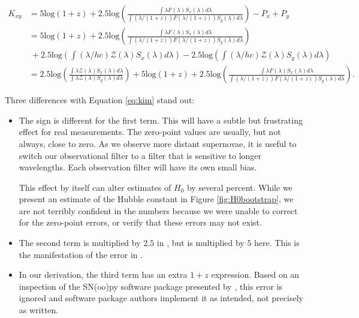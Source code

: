 \documentclass[linenumbers]{aastex631}
\begin{document}
\begin{equation}
\begin{aligned}
  K_{xy} &= 5 \text{log} (1 + z)
            + 2.5 \text{log} \left(
              \frac{\int \lambda F(\lambda) S_x(\lambda) d\lambda}
                   {\int (\lambda / (1+z)) F(\lambda / (1+z)) S_y(\lambda) d\lambda} \right)
            - P_x + P_y \\
         &= 5 \text{log} (1 + z)
            + 2.5 \text{log} \left(
              \frac{\int \lambda F(\lambda) S_x(\lambda) d\lambda}
                   {\int (\lambda / (1+z)) F(\lambda / (1+z)) S_y(\lambda) d\lambda} \right) \\ &\ 
            + 2.5 \text{log} \left( \int (\lambda / hc) \mathcal{Z}(\lambda) S_x(\lambda) d\lambda \right)
            - 2.5 \text{log} \left( \int (\lambda / hc) \mathcal{Z}(\lambda) S_y(\lambda) d\lambda \right) \\
         &= 2.5 \text{log} \left(
              \frac{\int \lambda \mathcal{Z}(\lambda) S_x(\lambda) d\lambda}
                   {\int \lambda \mathcal{Z}(\lambda) S_y(\lambda) d\lambda}
             \right)
            + 5 \text{log} (1 + z)
            + 2.5 \text{log} \left(
              \frac{\int \lambda F(\lambda) S_x(\lambda) d\lambda}
                   {\int (\lambda / (1+z)) F(\lambda / (1+z)) S_y(\lambda) d\lambda} \right) .
\end{aligned}
\end{equation}

Three differences with Equation \ref{eq:kim} stand out:

\begin{itemize}
  \item The sign is different for the first term. This will have a subtle but
  frustrating effect for real measurements. The zero-point values are usually,
  but not always, close to zero. As we observe more distant supernovae, it is
  useful to switch our observational filter to a filter that is sensitive to
  longer wavelengths. Each observation filter will have its own small bias.

  This effect by itself can alter estimates of $H_0$ by several percent. While
  we present an estimate of the Hubble constant in Figure
  \ref{fig:H0bootstrap}, we are not terribly confident in the numbers because
  we were unable to correct for the zero-point errors, or verify that these
  errors may not exist.

  \item The second term is multiplied by $2.5$ in \citet{kim1996}, but is
  multiplied by $5$ here. This is the manifestation of the error in
  \citet{tolman1930}.

  \item In our derivation, the third term has an extra $1 + z$ expression.
  Based on an inspection of the SN(oo)py software package presented by
  \citet{snpy}, this error is ignored and software package authors implement it
  as intended, not precisely as written.
\end{itemize}
\end{document}
